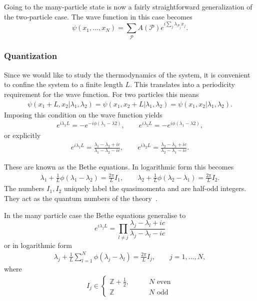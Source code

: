 \documentclass[11pt, a4paper]{report} %
\begin{document}
Going to the many-particle state is now a fairly straightforward generalization of the two-particle case.
The wave function in this case becomes~\cite{Franchini2017}
\begin{equation}
	\psi(x_1,\ldots,x_N) = \sum_{\mathcal{P}} A(\mathcal{P}) e^{i\sum_j \lambda_{\mathcal{P}_j} x_j}.
\end{equation}


\subsubsection{Quantization}

Since we would like to study the thermodynamics of the system, it is convenient to confine the system to a finite length \(L\).
This translates into a periodicity requirement for the wave function.
For two particles this means
\begin{align}
	\psi(x_1+L,x_2|\lambda_1,\lambda_2) = \psi(x_1,x_2+L|\lambda_1,\lambda_2) = \psi(x_1,x_2|\lambda_1,\lambda_2).
\end{align}
Imposing this condition on the wave function yields
\begin{align}
  e^{i\lambda_1L} = - e^{-i\phi(\lambda_1 - \lambda2)}, \qquad e^{i\lambda_2L} = - e^{i\phi(\lambda_1 - \lambda2)},
\end{align}
or explicitly~\cite{Franchini2017}
\begin{align}
  e^{i\lambda_1L} = \frac{\lambda_1-\lambda_2 + ic}{\lambda_1-\lambda_2-ic}, \qquad e^{i\lambda_2L} = \frac{\lambda_2-\lambda_1 + ic}{\lambda_2-\lambda_1-ic}.
\end{align}

These are known as the Bethe equations.
In logarithmic form this becomes 
\begin{align}\label{eq:bethe_equations}
  \lambda_1 + \frac{1}{L} \phi(\lambda_1-\lambda_2) = \frac{2\pi}{L} I_1, \qquad \lambda_2 + \frac{1}{L} \phi(\lambda_2-\lambda_1) = \frac{2\pi}{L} I_2.
\end{align}
The numbers \(I_1, I_2\) uniquely label the quasimomenta and are half-odd integers. 
They act as the quantum numbers of the theory~\cite{Franchini2017}.

In the many particle case the Bethe equations generalise to
\begin{equation}
  e^{i\lambda_jL} = \prod_{l\neq j} \frac{\lambda_j-\lambda_l + ic}{\lambda_j - \lambda_l - ic}
\end{equation}
or in logarithmic form
\begin{align}
  \lambda_j + \frac{1}{L} \sum_{l=1}^N \phi(\lambda_j - \lambda_l) = \frac{2\pi}{L}I_j, \qquad j = 1,\ldots,N,
\end{align}
where~\cite{Franchini2017}
\begin{align}
I_j \in 
\begin{cases}
  \mathbb{Z} + \frac{1}{2}, \qquad &N \textrm{ even}\\
  \mathbb{Z}  &N \textrm{ odd}
\end{cases}
\end{align}
\end{document}
